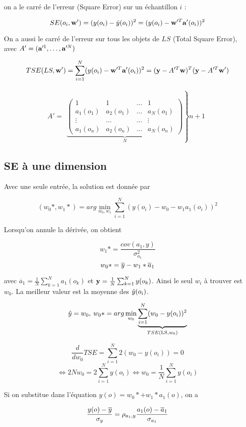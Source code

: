 	on a le carré de l'erreur (Square Error) sur un échantillon $i$ :
	
	$$SE(o_i, \textbf{w}') = (y(o_i) - \hat{y}(o_i))^2 = (y(o_i) - \textbf{w}'^T\textbf{a}'(o_i))^2$$
	
	On a aussi le carré de l'erreur sur tous les objets de $LS$ (Total Square Error), avec $A' = (\textbf{a}'^1, \dots , \textbf{a}'^N)$
	
	$$TSE(LS, \textbf{w}') = \sum_{i = 1}^N (y(o_i) - \textbf{w}'^T\textbf{a}'(o_i))^2 = (\textbf{y} - A'^T\textbf{w})^T(\textbf{y} - A'^T\textbf{w}')$$
	
	$$A' = \begin{array}{c}\left. \underbrace{\begin{pmatrix}
	1 & 1 & \dots & 1 \\ 
	a_1(o_1) & a_2(o_1) & \dots & a_N(o_1) \\ 
	\vdots & \dots & \dots & \vdots \\ 
	a_1(o_n) & a_2(o_n) & \dots & a_N(o_n)
	\end{pmatrix}}_{N}\right\} n + 1\end{array} $$
	
		\subsection{SE à une dimension}
		
		Avec une seule entrée, la solution est donnée par
		
		$$(w_0*, w_1*) = arg \min_{w_0, w_1} \sum_{i = 1}^N (y(o_i) - w_0 - w_1a_1(o_i))^2$$
		
		Lorsqu'on annule la dérivée, on obtient
		
		$$w_1* = \frac{cov(a_1, y)}{\sigma^2_{a_1}}$$
		$$w_0* = \overline{y} - w_1*\overline{a}_1$$
		
		avec $\overline{a}_1 = \frac{1}{N} \sum_{k = 1}^Na_1(o_k)$ et $\textbf{y} = \frac{1}{N} \sum_{k = 1}^N y(o_k)$. Ainsi le seul $w_i$ à trouver est $w_0$. La meilleur valeur est la moyenne des $\hat{y}(o_i)$.
		
		$$\hat{y} = w_0, \: w_0* = arg \min_{w_0} \underbrace{\sum_{i = 1}^N (w_0 - y(o_i))^2}_{TSE(\text{LS}, w_0)}$$
		
		$$\frac{d}{dw_0} TSE = \sum_{i = 1}^N 2(w_0 - y(o_i)) = 0$$
		$$\Leftrightarrow 2 N w_0 = 2 \sum_{i = 1}^N y(o_i) \Leftrightarrow w_0 = \frac{1}{N} \sum_{i = 1}^N y(o_i)$$
		
		Si on substitue dans l'équation $y(o) = w_0* + w_1*a_1(o)$, on a
		
		$$\frac{y(o) - \overline{y}}{\sigma_y} = \rho_{a_1, y} \frac{a_1(o) - \overline{a}_1}{\sigma_{a_1}}$$
		

